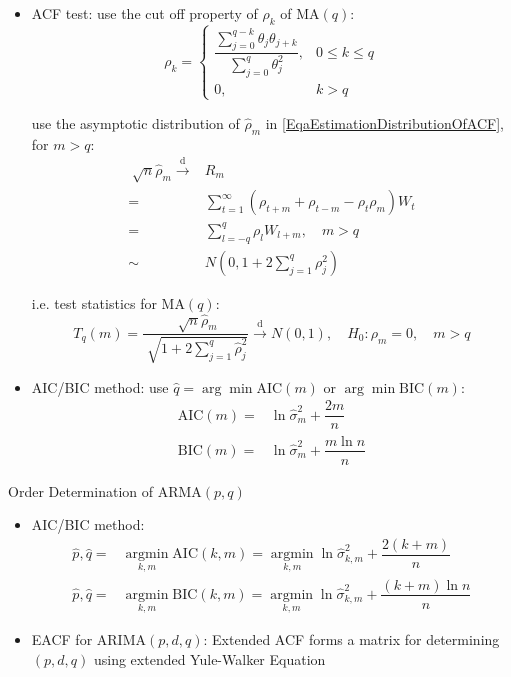 \begin{itemize}[topsep=2pt,itemsep=0pt]
    \item ACF test: use the cut off property of $ \rho  _k $ of MA$ (q) $:
    \begin{equation}
        \rho  _k=\begin{cases}
            \dfrac{\sum_{j=0}^{q-k}\theta _j\theta _{j+k}}{\sum_{j=0}^q\theta _j^2},&0\leq k\leq q\\
            0,&k>q
        \end{cases} 
    \end{equation}

    use the asymptotic distribution of $ \hat{\rho }_m $ in \autoref{EqaEstimationDistributionOfACF}, for $ m>q $:
    \begin{align}
        \sqrt[]{n}\hat{\rho }_m\xrightarrow[]{\mathrm{d}}& R_m\\
         =&\sum_{t=1}^\infty(\rho _{t+m}+\rho _{t-m}-\rho _t\rho _m)W_t\\
         =&\sum_{l=-q}^q\rho _lW_{l+m},\quad m>q\\
         \sim&N(0,1+2\sum_{j=1}^q\rho _j^2)
    \end{align}
    
    i.e. test statistics for MA$ (q) $:
    \[
        T_q(m)=\dfrac{\sqrt[]{n}\hat{\rho }_m}{\sqrt[]{1+2\sum_{j=1}^q\hat{\rho }_j^2}}\xrightarrow[]{\mathrm{d}} N(0,1),\quad H_0:\rho _m=0, \quad m>q 
    \]
    
    \item AIC/BIC method: use $\hat{q}= \arg\min \mathrm{AIC}(m)  $ or $ \arg\min\mathrm{BIC}(m)  $:
    \begin{align}
        \mathrm{AIC}(m)=&\ln \hat{\sigma }_m^2+\dfrac{2m}{n}\\
        \mathrm{BIC}(m)=&\ln \hat{\sigma }_m^2+\dfrac{m\ln n}{n}
    \end{align}

\end{itemize}

\begin{point}
    Order Determination of ARMA$ (p,q) $
\end{point}

\begin{itemize}[topsep=2pt,itemsep=0pt]
    \item AIC/BIC method:
    \begin{align}
        \hat{p},\hat{q}=&\mathop{\arg\min}\limits_{k,m}\mathrm{AIC}(k,m)=  \mathop{\arg\min}\limits_{k,m}\ln \hat{\sigma }^2_{k,m}+\dfrac{2(k+m)}{n}\\
        \hat{p},\hat{q}=&\mathop{\arg\min}\limits_{k,m}\mathrm{BIC}(k,m)=  \mathop{\arg\min}\limits_{k,m}\ln \hat{\sigma }^2_{k,m}+\dfrac{(k+m)\ln n}{n}
    \end{align}
    \item EACF for ARIMA$ (p,d,q) $: Extended ACF forms a matrix for determining $ (p,d,q) $ using extended Yule-Walker Equation 
\end{itemize}

